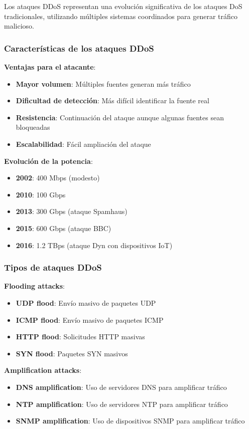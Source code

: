 Los ataques DDoS representan una evolución significativa de los ataques DoS tradicionales, utilizando múltiples sistemas coordinados para generar tráfico malicioso.

\subsubsection{Características de los ataques DDoS}

\textbf{Ventajas para el atacante}:
\begin{itemize}
    \item \textbf{Mayor volumen}: Múltiples fuentes generan más tráfico
    \item \textbf{Dificultad de detección}: Más difícil identificar la fuente real
    \item \textbf{Resistencia}: Continuación del ataque aunque algunas fuentes sean bloqueadas
    \item \textbf{Escalabilidad}: Fácil ampliación del ataque
\end{itemize}

\textbf{Evolución de la potencia}:
\begin{itemize}
    \item \textbf{2002}: 400 Mbps (modesto)
    \item \textbf{2010}: 100 Gbps
    \item \textbf{2013}: 300 Gbps (ataque Spamhaus)
    \item \textbf{2015}: 600 Gbps (ataque BBC)
    \item \textbf{2016}: 1.2 TBps (ataque Dyn con dispositivos IoT)
\end{itemize}

\subsubsection{Tipos de ataques DDoS}

\textbf{Flooding attacks}:
\begin{itemize}
    \item \textbf{UDP flood}: Envío masivo de paquetes UDP
    \item \textbf{ICMP flood}: Envío masivo de paquetes ICMP
    \item \textbf{HTTP flood}: Solicitudes HTTP masivas
    \item \textbf{SYN flood}: Paquetes SYN masivos
\end{itemize}

\textbf{Amplification attacks}:
\begin{itemize}
    \item \textbf{DNS amplification}: Uso de servidores DNS para amplificar tráfico
    \item \textbf{NTP amplification}: Uso de servidores NTP para amplificar tráfico
    \item \textbf{SNMP amplification}: Uso de dispositivos SNMP para amplificar tráfico
\end{itemize}

